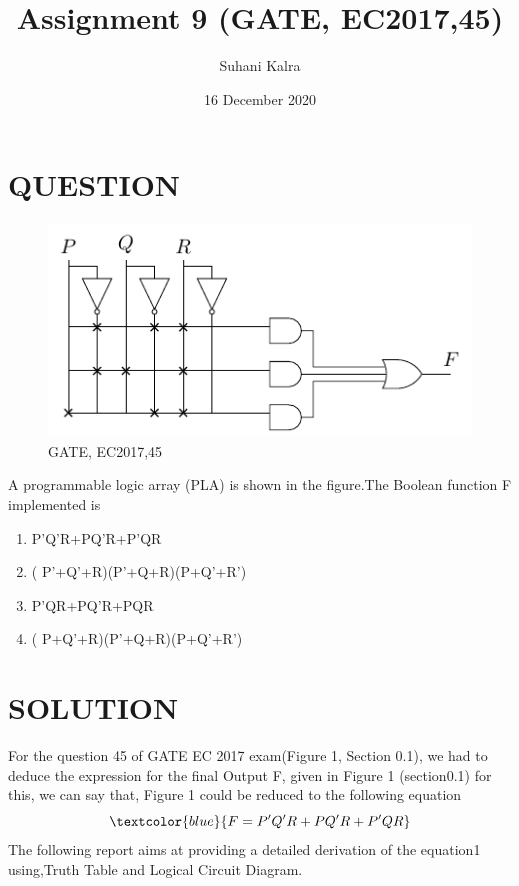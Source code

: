 \documentclass{report}
\title{Assignment 9 (GATE, EC2017,45)}
\author{Suhani Kalra }
\date{16 December 2020}
\begin{document}
\LARGE



\maketitle


\section{QUESTION}

\begin{figure}[htp]
\centering
\includegraphics[width=17cm]{image.pdf}
\caption{GATE, EC2017,45}
\label{fig:ok}
\end{figure}

A programmable logic array (PLA) is shown in the figure.The Boolean function F implemented is

 \begin{enumerate}
 \item P'Q'R+PQ'R+P'QR
\item ( P'+Q'+R)(P'+Q+R)(P+Q'+R')
\item P'QR+PQ'R+PQR
\item ( P+Q'+R)(P'+Q+R)(P+Q'+R')
  \end{enumerate}




\newpage
\section{SOLUTION}
For the question 45 of GATE EC 2017 exam(Figure 1, Section 0.1),
\newline
we had to deduce the expression for the final Output F, given in Figure 1 (section0.1) for this, we can say that, Figure 1 could be reduced to the following equation
\begin{equation}
   \textcolor{blue}{F = P'Q'R+PQ'R+P'QR}
\end{equation}
 The following report aims at providing a detailed derivation of the equation1 using,Truth Table and Logical Circuit Diagram.
   
\end{document}
